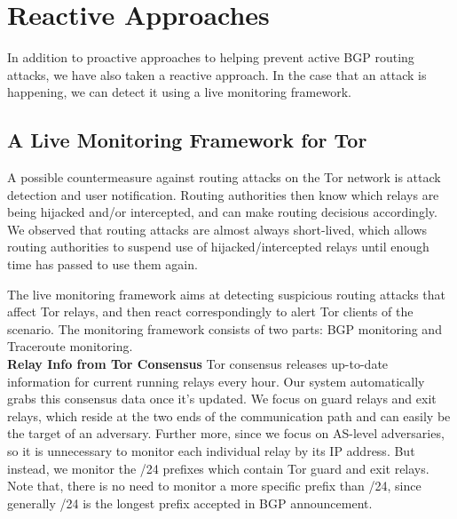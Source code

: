 \section{Reactive Approaches}
In addition to proactive approaches to helping prevent active BGP routing attacks, we have also taken a reactive approach.  In the case that an attack is happening, we can detect it using a live monitoring framework.

\subsection{A Live Monitoring Framework for Tor}
A possible countermeasure against routing attacks on the Tor network is attack 
detection and user notification.  Routing authorities then know which relays are 
being hijacked and/or intercepted, and can make routing decisious accordingly.  
We observed that routing attacks are almost always short-lived, which allows 
routing authorities to suspend use of hijacked/intercepted relays until enough 
time has passed to use them again.

The live monitoring framework aims at detecting suspicious routing attacks that affect Tor relays, and then react correspondingly to alert Tor clients of the scenario. The monitoring framework consists of two parts: BGP monitoring and Traceroute monitoring.\\

{\bf Relay Info from Tor Consensus} Tor consensus releases up-to-date information for current running relays every hour. Our system automatically grabs this consensus data once it's updated. We focus on guard relays and exit relays, which reside at the two ends of the communication path and can easily be the target of an adversary. Further more, since we focus on AS-level adversaries, so it is unnecessary to monitor each individual relay by its IP address. But instead, we monitor the /24 prefixes which contain Tor guard and exit relays. Note that, there is no need to monitor a more specific prefix than /24, since generally /24 is the longest prefix accepted in BGP announcement. \\


